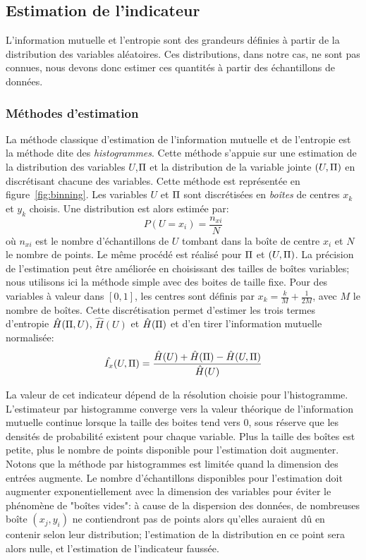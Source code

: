\subsection{Estimation de l'indicateur}

L'information mutuelle et l'entropie sont des grandeurs définies à partir de la distribution des variables aléatoires. Ces distributions, dans notre cas, ne sont pas connues, nous devons donc estimer ces quantités à partir des échantillons de données.

\subsubsection{Méthodes d'estimation}

La méthode classique d'estimation de l'information mutuelle et de l'entropie est la méthode dite des \emph{histogrammes}.
Cette méthode s'appuie sur une estimation de la distribution des variables $U$,$\Pi$ et la distribution de la variable jointe $(U,\Pi)$ en discrétisant chacune des variables.
Cette méthode est représentée en figure~\ref{fig:binning}. Les variables $U$ et $\Pi$ sont discrétisées en \emph{boîtes} de centres $x_k$ et $y_k$ choisis.
Une distribution est alors estimée par: 
$$P(U = x_i) = \frac{n_{xi}}{N} $$ où $n_{xi}$ est le nombre d'échantillons de $U$ tombant dans la boîte de centre $x_i$ et $N$ le nombre de points. Le même procédé est réalisé pour $\Pi$ et $(U,\Pi)$. La précision de l'estimation peut être améliorée en choisissant des tailles de boîtes variables; nous utilisons ici la méthode simple avec des boites de taille fixe.
Pour des variables à valeur dans $[0,1]$, les centres sont définis par $x_k = \frac{k}{M}+\frac{1}{2M}$, avec $M$ le nombre de boîtes.
Cette discrétisation permet d'estimer les trois termes d'entropie $\hat{H}(\Pi,U)$, $\hat{H}(U)$ et $\hat{H}(\Pi)$ et d'en tirer l'information mutuelle normalisée:
\begin{equation}
    \hat{I_x}(U,\Pi) = \frac{\hat{H}(U) + \hat{H}(\Pi) - \hat{H}(U,\Pi)}{\hat{H}(U)}
   \end{equation}

La valeur de cet indicateur dépend de la résolution choisie pour l'histogramme. L'estimateur  par histogramme converge vers la valeur théorique de l'information mutuelle continue lorsque la taille des boites tend vers 0, sous réserve que les densités de probabilité existent pour chaque variable. Plus la taille des boîtes est petite, plus le nombre de points disponible pour l'estimation doit augmenter.
Notons que la méthode par histogrammes est limitée quand la dimension des entrées augmente.
Le nombre d'échantillons disponibles pour l'estimation doit augmenter exponentiellement avec la dimension des variables pour éviter le phénomène de "boîtes vides": à cause de la dispersion des données, de nombreuses boîte $(x_j,y_i)$ ne contiendront pas de points alors qu'elles auraient dû en contenir selon leur distribution; l'estimation de la distribution en ce point sera alors nulle, et l'estimation de l'indicateur faussée.

